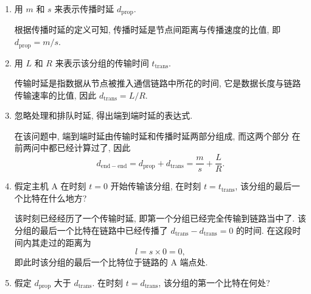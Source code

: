 \documentclass[10pt,UTF8]{book} %
\begin{document}
\begin{example}
\begin{figure}[H]
\begin{tikzpicture}[x=0.75pt,y=0.75pt,yscale=-1,xscale=1]
        
        \end{tikzpicture}
    \end{figure}
    \begin{enumerate}[label={$\left.\mathrm{\alph*}\right)$}, itemsep=0pt]
        \item 用 $m$ 和 $s$ 来表示传播时延 $d_\mathrm{prop}$.
        \begin{sol}
            根据传播时延的定义可知, 传播时延是节点间距离与传播速度的比值, 即
            $d_\mathrm{prop} = m/s$.
        \end{sol}
        \item 用 $L$ 和 $R$ 来表示该分组的传输时间 $t_\mathrm{trans}$.
        \begin{sol}
            传输时延是指数据从节点被推入通信链路中所花的时间,
            它是数据长度与链路传输速率的比值, 因此 $d_\mathrm{trans} = L/R$.
        \end{sol}
        \item 忽略处理和排队时延, 得出端到端时延的表达式.
        \begin{sol}
            在该问题中, 端到端时延由传输时延和传播时延两部分组成, 而这两个部分
            在前两问中都已经计算过了, 因此
            \[ d_\mathrm{end-end} = d_\mathrm{prop} + d_\mathrm{trans}
            = \dfrac{m}{s} + \dfrac{L}{R}. \]
        \end{sol}
        \item 假定主机 A 在时刻 $t=0$ 开始传输该分组, 在时刻 $t = t_\mathrm{trans}$,
        该分组的最后一个比特在什么地方?
        \begin{sol}
            该时刻已经经历了一个传输时延, 即第一个分组已经完全传输到链路当中了.
            该分组的最后一个比特在链路中已经传播了 $d_\mathrm{trans} - d_\mathrm{trans}
            = 0$ 的时间. 在这段时间内其走过的距离为
            \[ l = s \times 0 = 0, \]
            即此时该分组的最后一个比特位于链路的 A 端点处.
        \end{sol}
        \item 假定 $d_\mathrm{prop}$ 大于 $d_\mathrm{trans}$. 
        在时刻 $t = d_\mathrm{trans}$, 该分组的第一个比特在何处?
        \begin{sol}

\end{sol}
\end{enumerate}
\end{example}
\end{document}
